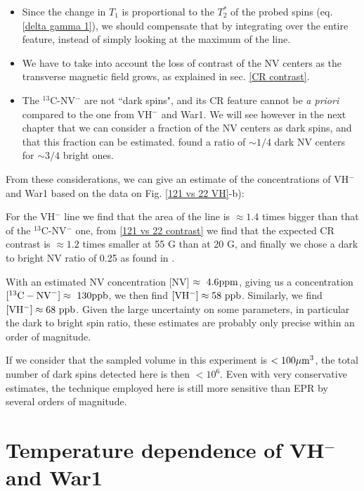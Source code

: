 \documentclass[a4paper, 11pt]{report}
\begin{document}
\begin{itemize}
\item Since the change in $T_1$ is proportional to the $T_2^*$ of the probed spins (eq. \ref{delta gamma 1}), we should compensate that by integrating over the entire feature, instead of simply looking at the maximum of the line.
\item We have to take into account the loss of contrast of the NV centers as the transverse magnetic field grows, as explained in sec. \ref{CR contrast}.
\item The $^{13}$C-NV$^-$ are not ``dark spins", and its CR feature cannot be \textit{a priori} compared to the one from VH$^-$ and War1. We will see however in the next chapter that we can consider a fraction of the NV centers as dark spins, and that this fraction can be estimated. \citep{choi2017depolarization} found a ratio of $\sim 1/4$ dark NV centers for $\sim 3/4$ bright ones.
\end{itemize}

From these considerations, we can give an estimate of the concentrations of VH$^-$ and War1 based on the data on Fig. \ref{121 vs 22 VH}-b): 

For the VH$^-$ line we find that the area of the line is $\approx 1.4$ times bigger than that of the $^{13}$C-NV$^-$ one, from \ref{121 vs 22 contrast} we find that the expected CR contrast is $\approx 1.2$ times smaller at 55 G than at 20 G, and finally we chose a dark to bright NV ratio of 0.25 as found in \citep{choi2017depolarization}.

With an estimated NV concentration [NV] $\approx\ \rm 4.6 ppm$, giving us a concentration $[^{13}\rm{C-NV}^-]\approx \ \rm 130 ppb$, we then find $[\rm VH^-] \approx 58\ \rm ppb$. Similarly, we find $[\rm VH^-] \approx 68\ \rm ppb$. Given the large uncertainty on some parameters, in particular the dark to bright spin ratio, these estimates are probably only precise within an order of magnitude.

If we consider that the sampled volume in this experiment is $< 100 \mu \rm{m}^3$, the total number of dark spins detected here is then $< 10^6$. Even with very conservative estimates, the technique employed here is still more sensitive than EPR by several orders of magnitude.

\section{Temperature dependence of VH$^-$ and War1}
\end{document}
